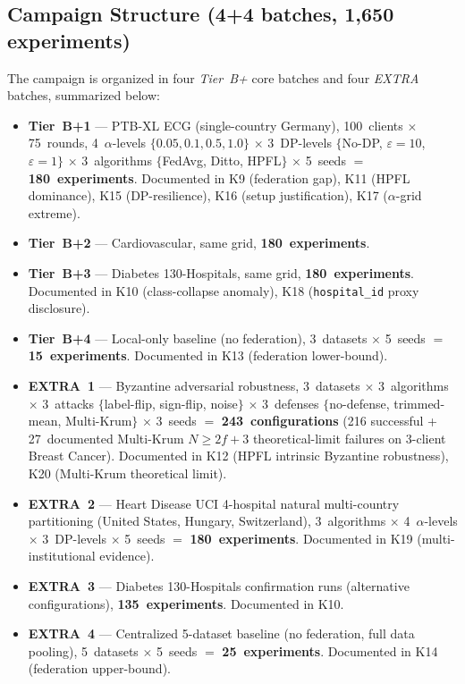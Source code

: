 \documentclass[conference]{IEEEtran}
\begin{document}
\subsection*{Campaign Structure (4+4 batches, 1{,}650 experiments)}
\label{sec:tier_b_structure}

The campaign is organized in four \emph{Tier~B+} core batches and four \emph{EXTRA} batches, summarized below:

\begin{itemize}
\item \textbf{Tier~B+1} — PTB-XL ECG (single-country Germany), 100~clients $\times$ 75~rounds, 4~$\alpha$-levels $\{0.05, 0.1, 0.5, 1.0\}$ $\times$ 3~DP-levels $\{$No-DP, $\varepsilon{=}10$, $\varepsilon{=}1\}$ $\times$ 3~algorithms $\{$FedAvg, Ditto, HPFL$\}$ $\times$ 5~seeds $=$ \textbf{180~experiments}. Documented in K9 (federation gap), K11 (HPFL dominance), K15 (DP-resilience), K16 (setup justification), K17 ($\alpha$-grid extreme).
\item \textbf{Tier~B+2} — Cardiovascular, same grid, \textbf{180~experiments}.
\item \textbf{Tier~B+3} — Diabetes 130-Hospitals, same grid, \textbf{180~experiments}. Documented in K10 (class-collapse anomaly), K18 (\texttt{hospital\_id} proxy disclosure).
\item \textbf{Tier~B+4} — Local-only baseline (no federation), 3~datasets $\times$ 5~seeds $=$ \textbf{15~experiments}. Documented in K13 (federation lower-bound).
\item \textbf{EXTRA~1} — Byzantine adversarial robustness, 3~datasets $\times$ 3~algorithms $\times$ 3~attacks $\{$label-flip, sign-flip, noise$\}$ $\times$ 3~defenses $\{$no-defense, trimmed-mean, Multi-Krum$\}$ $\times$ 3~seeds $=$ \textbf{243~configurations} (216 successful + 27~documented Multi-Krum $N{\geq}2f{+}3$ theoretical-limit failures on 3-client Breast Cancer). Documented in K12 (HPFL intrinsic Byzantine robustness), K20 (Multi-Krum theoretical limit).
\item \textbf{EXTRA~2} — Heart Disease UCI 4-hospital natural multi-country partitioning (United States, Hungary, Switzerland), 3~algorithms $\times$ 4~$\alpha$-levels $\times$ 3~DP-levels $\times$ 5~seeds $=$ \textbf{180~experiments}. Documented in K19 (multi-institutional evidence).
\item \textbf{EXTRA~3} — Diabetes 130-Hospitals confirmation runs (alternative configurations), \textbf{135~experiments}. Documented in K10.
\item \textbf{EXTRA~4} — Centralized 5-dataset baseline (no federation, full data pooling), 5~datasets $\times$ 5~seeds $=$ \textbf{25~experiments}. Documented in K14 (federation upper-bound).
\end{itemize}
\end{document}
